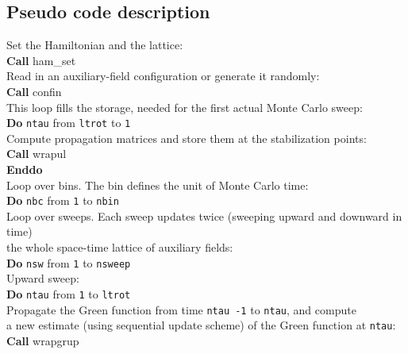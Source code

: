 %
\subsection{Pseudo code description}\label{sec:pseudocode}
%
\begin{mdframed}[frametitle={Basic structure of the auxiliary field QMC implementation (\path{Prog/main.f90}):}]
{\setlength{\parindent}{0pt}
Set the Hamiltonian and the lattice:\\
\textbf{Call} ham\_set\\
Read in an auxiliary-field configuration or generate it randomly:\\
\textbf{Call} confin\\

This loop fills the storage, needed for the first actual Monte Carlo sweep:\\
\textbf{Do} \texttt{ntau} from  \texttt{ltrot} to \texttt{1}\\
\hspace*{1em} Compute propagation matrices and store them at the stabilization points:\\
\hspace*{1em} \textbf{Call} wrapul\\
\textbf{Enddo}\\
 
Loop over bins. The bin defines the unit of Monte Carlo time:\\
\textbf{Do} \texttt{nbc} from  \texttt{1} to \texttt{nbin} \\
\hspace*{1em} Loop over sweeps. Each sweep updates twice (sweeping upward and downward in time)\\
\hspace*{1em} the whole space-time lattice of auxiliary fields:\\
\hspace*{1em} \textbf{Do} \texttt{nsw} from  \texttt{1} to \texttt{nsweep}  \\
\hspace*{2em} Upward sweep:\\
\hspace*{2em} \textbf{Do} \texttt{ntau} from \texttt{1} to \texttt{ltrot}\\      
\hspace*{3em} Propagate the Green function from time \texttt{ntau -1} to \texttt{ntau}, and compute\\
\hspace*{3em} a new estimate (using sequential update scheme) of the Green function at \texttt{ntau}: \\
\hspace*{3em} \textbf{Call} wrapgrup\\
         
}
\end{mdframed}
